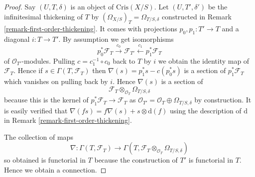 \begin{proof}
Say $(U, T, \delta)$ is an object of $\text{Cris}(X/S)$.
Let $(U, T', \delta')$ be the infinitesimal thickening of $T$
by $(\Omega_{X/S})_T = \Omega_{T/S, \delta}$
constructed in Remark \ref{remark-first-order-thickening}.
It comes with projections $p_0, p_1 : T' \to T$
and a diagonal $i : T \to T'$. By assumption we get
isomorphisms
$$
p_0^*\mathcal{F}_T \xrightarrow{c_0}
\mathcal{F}_{T'} \xleftarrow{c_1}
p_1^*\mathcal{F}_T
$$
of $\mathcal{O}_{T'}$-modules. Pulling $c = c_1^{-1} \circ c_0$
back to $T$ by $i$ we obtain the identity map
of $\mathcal{F}_T$. Hence if $s \in \Gamma(T, \mathcal{F}_T)$
then $\nabla(s) = p_1^*s - c(p_0^*s)$ is a section of
$p_1^*\mathcal{F}_T$ which vanishes on pulling back by $i$. Hence
$\nabla(s)$ is a section of
$$
\mathcal{F}_T
\otimes_{\mathcal{O}_T}
\Omega_{T/S, \delta}
$$
because this is the kernel of $p_1^*\mathcal{F}_T \to \mathcal{F}_T$
as $\mathcal{O}_{T'} = \mathcal{O}_T \oplus \Omega_{T/S, \delta}$
by construction. It is easily verified that $\nabla(fs) =
f\nabla(s) + s \otimes \text{d}(f)$ using the description of
$\text{d}$ in Remark \ref{remark-first-order-thickening}.

\medskip\noindent
The collection of maps
$$
\nabla : \Gamma(T, \mathcal{F}_T) \to
\Gamma(T, \mathcal{F}_T \otimes_{\mathcal{O}_T} \Omega_{T/S, \delta})
$$
so obtained is functorial in $T$ because the construction of $T'$
is functorial in $T$. Hence we obtain a connection.


\end{proof}

